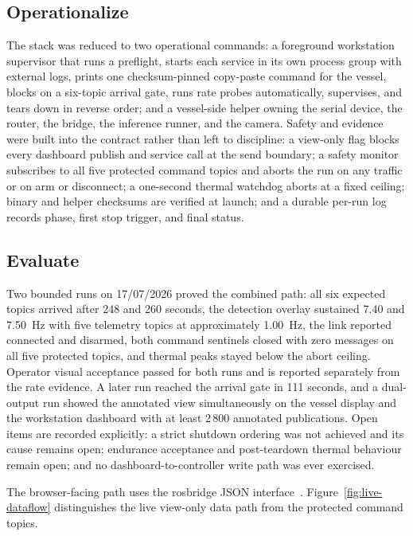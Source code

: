 \documentclass[a4paper,12pt,oneside,openany]{report}
\begin{document}
\subsection{Operationalize}

The stack was reduced to two operational commands: a foreground workstation supervisor that runs a
preflight, starts each service in its own process group with external logs, prints one
checksum-pinned copy-paste command for the vessel, blocks on a six-topic arrival gate, runs rate
probes automatically, supervises, and tears down in reverse order; and a vessel-side helper owning
the serial device, the router, the bridge, the inference runner, and the camera. Safety and evidence
were built into the contract rather than left to discipline: a view-only flag blocks every dashboard
publish and service call at the send boundary; a safety monitor subscribes to all five protected
command topics and aborts the run on any traffic or on arm or disconnect; a one-second thermal
watchdog aborts at a fixed ceiling; binary and helper checksums are verified at launch; and a
durable per-run log records phase, first stop trigger, and final status.

\subsection{Evaluate}

Two bounded runs on 17/07/2026 proved the combined path: all six expected topics arrived after 248
and 260 seconds, the detection overlay sustained 7.40 and 7.50~Hz with five telemetry topics at
approximately 1.00~Hz, the link reported connected and disarmed, both command sentinels closed with
zero messages on all five protected topics, and thermal peaks stayed below the abort ceiling.
Operator visual acceptance passed for both runs and is reported separately from the rate evidence. A
later run reached the arrival gate in 111 seconds, and a dual-output run showed the annotated view
simultaneously on the vessel display and the workstation dashboard with at least 2\,800 annotated
publications. Open items are recorded explicitly: a strict shutdown ordering was not achieved and
its cause remains open; endurance acceptance and post-teardown thermal behaviour remain open; and no
dashboard-to-controller write path was ever exercised.

The browser-facing path uses the rosbridge JSON interface~\cite{rosbridge}.
Figure~\ref{fig:live-dataflow} distinguishes the live view-only data path from the protected command
topics.
\end{document}
